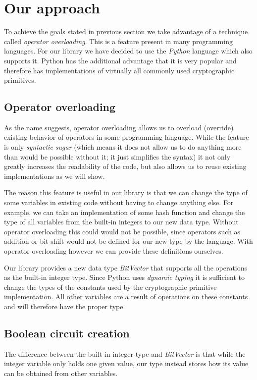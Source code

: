 \section{Our approach}
To achieve the goals stated in previous section we take advantage of a technique called \emph{operator overloading}.
This is a feature present in many programming languages.
For our library we have decided to use the \emph{Python} language which also supports it.
Python has the additional advantage that it is very popular and therefore has implementations of virtually all commonly used cryptographic primitives.

\subsection{Operator overloading}
\label{sec:operator-overloading}
As the name suggests, operator overloading allows us to overload (override) existing behavior of operators in some programming language.
While the feature is only \emph{syntactic sugar} (which means it does not allow us to do anything more than would be possible without it; it just simplifies the syntax) it not only greatly increases the readability of the code, but also allows us to reuse existing implementations as we will show.

The reason this feature is useful in our library is that we can change the type of some variables in existing code without having to change anything else.
For example, we can take an implementation of some hash function and change the type of all variables from the built-in integers to our new data type.
Without operator overloading this could would not be possible, since operators such as addition or bit shift would not be defined for our new type by the language.
With operator overloading however we can provide these definitions ourselves.

Our library provides a new data type \emph{BitVector} that supports all the operations as the built-in integer type.
Since Python uses \emph{dynamic typing} it is sufficient to change the types of the constants used by the cryptographic primitive implementation.
All other variables are a result of operations on these constants and will therefore have the proper type.

\subsection{Boolean circuit creation}
The difference between the built-in integer type and \emph{BitVector} is that while the integer variable only holds one given value, our type instead stores how its value can be obtained from other variables.

